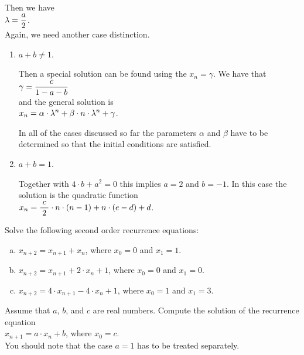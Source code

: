 \begin{enumerate}
      Then we have 
      \\[0.2cm]
      \hspace*{1.3cm}
      $\displaystyle \lambda = \frac{a}{2}$.
      \\[0.2cm]
      Again, we need another case distinction.
      \begin{enumerate}
      \item $a + b \not= 1$.

            Then a special solution can be found using the   $x_n = \gamma$.
            We have that
            \\[0.2cm]
            \hspace*{1.3cm}
            $\displaystyle \gamma = \frac{c}{1 - a - b}$
            \\[0.2cm]
            and the general solution is
            \\[0.2cm]
            \hspace*{1.3cm}
            $\displaystyle x_{n} = \alpha \cdot \lambda^n + \beta \cdot n \cdot \lambda^n + \gamma$.

            In all of the cases discussed so far the parameters $\alpha$ and $\beta$ have to be determined so
            that the initial conditions are satisfied.

      \item $a + b = 1$.

            Together with $4 \cdot b + a^2 = 0$ this implies $a = 2$ and $b = -1$.
            In this case the solution is the quadratic function
            \\[0.2cm]
            \hspace*{1.3cm}
            $x_n = \displaystyle \frac{\;c\;}{2} \cdot n \cdot (n-1) + n \cdot (e - d) + d$.
      \end{enumerate}
\end{enumerate}


\exercise
Solve the following second order recurrence equations:
\begin{enumerate}[(a)]
\item $x_{n+2} = x_{n+1} + x_n$, \quad where $x_0 = 0$ and $x_1 = 1$.  
\item $x_{n+2} = x_{n+1} + 2 \cdot x_n + 1$, \quad where $x_0 = 0$ and $x_1 = 0$.  
\item $x_{n+2} = 4 \cdot x_{n+1} - 4 \cdot x_n + 1$, \quad where $x_0 = 1$ and $x_1 = 3$.  \eox
\end{enumerate}

\exercise
Assume that $a$, $b$, and $c$ are real numbers.  Compute the solution of the recurrence equation
\\[0.2cm]
\hspace*{1.3cm}
$x_{n+1} = a \cdot x_n + b$, \quad where $x_0 = c$.
\\[0.2cm]
You should note that the case $a = 1$ has to be treated separately. 
\eox

